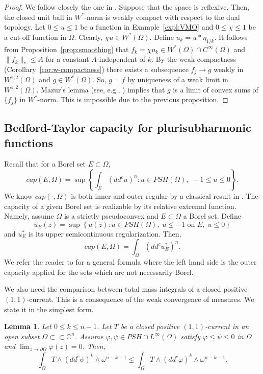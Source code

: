\documentclass{amsart}
\renewcommand{\d}{\partial}
\newcommand{\vphi}{\varphi}
\newcommand{\om}{\omega}
\newcommand{\Om}{\Omega}
\newcommand{\bC}{\mathbb{C}}
\newtheorem{lem}[thm]{Lemma}
\theoremstyle{definition}
\numberwithin{thm}{section}
\numberwithin{equation}{section}
\renewcommand{\[}{\begin{equation}}
\renewcommand{\]}{\end{equation}}
\newcommand{\wed}{\wedge}
\begin{document}
\begin{proof} We follow closely the one in \cite[Corollary~8]{Vigny}. Suppose that the space is reflexive. Then, the closed unit ball in $W^*$-norm is weakly compact with respect to the dual topology. Let $0\leq u \leq 1$ be a function in Example~\ref{expl:VMO} and $0 \leq \chi \leq 1$ be a cut-off function in $\Om$. Clearly, $\chi u \in W^*(\Om)$. Define $u_k = u*\eta_{1/k}$.  It follows from Proposition~\ref{prop:smoothing} that $f_k=\chi u_k \in W^*(\Om) \cap C^\infty(\Om)$ and $\|f_k\|_* \leq A$ for a constant $A$ independent of $k$.
By the weak compactness (Corollary~\ref{cor:w-compactness})  there exists a subsequence $f_j \to g$ weakly in $W^{1,2}(\Om) $ and $g\in W^*(\Om)$. So, $g =f $ by uniqueness of a weak limit in $W^{1,2}(\Om)$. Mazur's lemma (see, e.g., \cite[Theorem~2, page 120]{Yo80}) implies that $g$ is a limit of  convex sums  of $\{f_j\}$ in $W^*$-norm. This is impossible due to the previous proposition. 
\end{proof}

\subsection{Bedford-Taylor capacity for plurisubharmonic functions}
\label{ss:BT-cap}
Recall that for a Borel set $E\subset \Om$,
\[\label{eq:BT-cap}
 cap(E,\Om) = \sup\left\{ \int_E (dd^c u)^n :  u\in PSH(\Om), \;-1 \leq u \leq 0\right\}.
\]
We know   $cap (\cdot,\Om)$ is both inner and outer regular by a classical result in \cite{BT82}. The capacity of a given Borel set is realizable by its relative extremal function. Namely,  assume $\Om$ is a strictly pseudoconvex and  $E\subset \Om$ a Borel set. Define
\[\label{eq:rel-ext-fct}
	u_E(z) = \sup\left\{ u(z): u\in PSH(\Om), \; u \leq -1 \text{ on } E,\; u \leq 0 \right\}
\]
and $u_E^*$ is its upper semicontinuous regularization. Then,
\[\label{eq:BT-cap-id}
	cap(E, \Om) = \int_\Om (dd^c u_E^*)^n.
\] 
We refer the reader to \cite[Proposition~6.5]{BT82} for a general formula where the left hand side is the outer capacity applied for the sets  which are  not necessarily Borel.

We also need the comparison between total mass integrals of 
a closed positive $(1,1)$-current. This is a consequence of the weak convergence of measures.  We state it in the simplest form.

\begin{lem} \label{lem:CP-mass} Let $0\leq k\leq n-1$.  Let $T$ be a closed positive $(1,1)$-current in an open subset $\Om \subset \subset \bC^n$. 
Assume $\vphi,\psi \in PSH \cap L^\infty(\Om)$ satisfy  $\vphi \leq \psi \leq 0$ in $\Om$ and $\lim_{z\to \d\Om} \vphi(z) =0$. Then, 
\[\label{eq:CP-mass}
	\int_\Om T  \wed (dd^c \psi)^k \wed \om^{n-k-1} \leq \int_\Om T  \wed (dd^c \vphi)^k \wed \om^{n-k-1}. 
\]
\end{lem}
\end{document}
